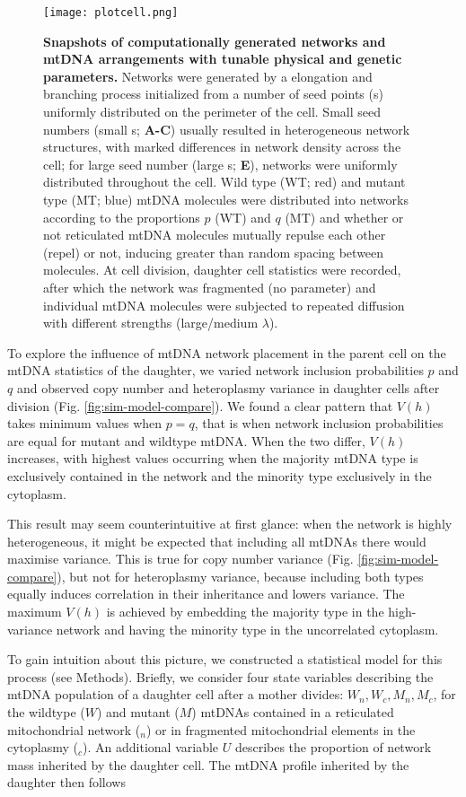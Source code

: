 \documentclass{article}
\begin{document}
\begin{figure}
\centering
\texttt{[image: plotcell.png]}
\caption{\textbf{Snapshots of computationally generated networks and mtDNA arrangements with tunable physical and genetic parameters.}  Networks were generated by a elongation and branching process initialized from a number of seed points (s) uniformly distributed on the perimeter of the cell. Small seed numbers (small s; \textbf{A-C}) usually resulted in heterogeneous network structures, with marked differences in network density across the cell; for large seed number (large s; \textbf{E}), networks were uniformly distributed throughout the cell. Wild type (WT; red) and mutant type (MT; blue) mtDNA molecules were distributed into networks according to the proportions $p$ (WT) and $q$ (MT) and whether or not reticulated mtDNA molecules mutually repulse each other (repel) or not, inducing greater than random spacing between molecules. At cell division, daughter cell statistics were recorded, after which the network was fragmented (no parameter) and individual mtDNA molecules were subjected to repeated diffusion with different strengths (large/medium $\lambda$).}\label{fig:plotcell}
\end{figure}

To explore the influence of mtDNA network placement in the parent cell on the mtDNA statistics of the daughter, we varied network inclusion probabilities $p$ and $q$ and observed copy number and heteroplasmy variance in daughter cells after division (Fig. \ref{fig:sim-model-compare}). We found a clear pattern that $V(h)$ takes minimum values when $p=q$, that is when network inclusion probabilities are equal for mutant and wildtype mtDNA. When the two differ, $V(h)$ increases, with highest values occurring when the majority mtDNA type is exclusively contained in the network and the minority type exclusively in the cytoplasm. 

This result may seem counterintuitive at first glance: when the network is highly heterogeneous, it might be expected that including all mtDNAs there would maximise variance. This is true for copy number variance (Fig. \ref{fig:sim-model-compare}), but not for heteroplasmy variance, because including both types equally induces correlation in their inheritance and lowers variance. The maximum $V(h)$ is achieved by embedding the majority type in the high-variance network and having the minority type in the uncorrelated cytoplasm. 

To gain intuition about this picture, we constructed a statistical model for this process (see Methods). Briefly, we consider four state variables describing the mtDNA population of a daughter cell after a mother divides: $W_n, W_c, M_n, M_c$, for the wildtype ($W$) and mutant ($M$) mtDNAs contained in a reticulated mitochondrial network (${}_n$) or in fragmented mitochondrial elements in the cytoplasmy (${}_c$). An additional variable $U$ describes the proportion of network mass inherited by the daughter cell. The mtDNA profile inherited by the daughter then follows
\end{document}

